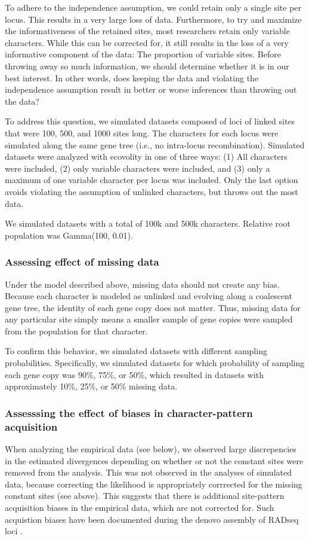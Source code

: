 To adhere to the independence assumption, we could retain only a single site
per locus.
This results in a very large loss of data.
Furthermore, to try and maximize the informativeness of the retained sites,
most researchers retain only variable characters.
While this can be corrected for, it still results in the loss of a very
informative component of the data: The proportion of variable sites.
Before throwing away so much information, we should determine whether
it is in our best interest.
In other words, does keeping the data and violating the independence
assumption result in better or worse inferences than throwing out the 
data?

To address this question, 
we simulated datasets composed of loci of linked sites that were 100, 500, and
1000 sites long.
The characters for each locus were simulated along the same gene tree (i.e., no
intra-locus recombination).
Simulated datasets were analyzed with ecovolity in one of three ways:
(1) All characters were included,
(2) only variable characters were included,
and
(3) only a maximum of one variable character per locus was included.
Only the last option avoids violating the assumption of unlinked characters,
but throws out the most data.

We simulated datasets with a total of 100k and 500k characters.
Relative root population was Gamma(100, 0.01).


\subsubsection{Assessing effect of missing data}
Under the model described above, missing data should not create any bias.
Because each character is modeled as unlinked and evolving along
a coalescent gene tree, the identity of each gene copy does not matter.
Thus, missing data for any particular site simply means a smaller sample of
gene copies were sampled from the population for that character.

To confirm this behavior, we simulated datasets with different sampling
probabilities.
Specifically, we simulated datasets for which probability of sampling each gene
copy was 90\%, 75\%, or 50\%, which resulted in datasets with approximately
10\%, 25\%, or 50\% missing data.

\subsubsection{Assesssing the effect of biases in character-pattern acquisition}
When analyzing the empirical data (see below),
we observed large discrepencies in the estimated divergences depending on
whether or not the constant sites were removed from the analysis.
This was not observed in the analyses of simulated data, because correcting the
likelihood is appropriately corrrected for the missing constant sites (see
above).
This suggests that there is additional site-pattern acquisition biases in the
empirical data, which are not corrected for.
Such acquistion biases have been documented during the denovo assembly of
RADseq loci \citep{Harvey2015,Linck2017}.

